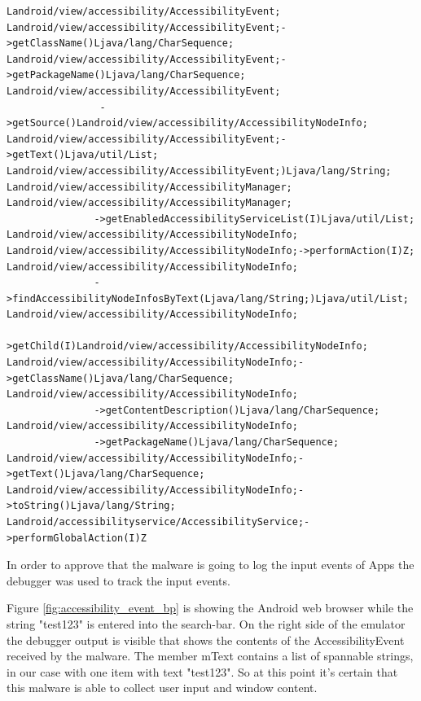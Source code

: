 \documentclass[10pt,titlepage]{article}
\begin{document}
\begin{lstlisting}[label=listofaccessibilitycalls,caption=List of calls to the Accessibility framework of Android. The malware is searching for UI widgets as well as performs global actions (can dismiss Activities like Settings) and gather text entered into UI widgets.,frame=tb]
Landroid/view/accessibility/AccessibilityEvent;
Landroid/view/accessibility/AccessibilityEvent;->getClassName()Ljava/lang/CharSequence;
Landroid/view/accessibility/AccessibilityEvent;->getPackageName()Ljava/lang/CharSequence;
Landroid/view/accessibility/AccessibilityEvent;
                ->getSource()Landroid/view/accessibility/AccessibilityNodeInfo;
Landroid/view/accessibility/AccessibilityEvent;->getText()Ljava/util/List;
Landroid/view/accessibility/AccessibilityEvent;)Ljava/lang/String;
Landroid/view/accessibility/AccessibilityManager;
Landroid/view/accessibility/AccessibilityManager;
               ->getEnabledAccessibilityServiceList(I)Ljava/util/List;
Landroid/view/accessibility/AccessibilityNodeInfo;
Landroid/view/accessibility/AccessibilityNodeInfo;->performAction(I)Z;
Landroid/view/accessibility/AccessibilityNodeInfo;
               ->findAccessibilityNodeInfosByText(Ljava/lang/String;)Ljava/util/List;
Landroid/view/accessibility/AccessibilityNodeInfo;
                >getChild(I)Landroid/view/accessibility/AccessibilityNodeInfo;
Landroid/view/accessibility/AccessibilityNodeInfo;->getClassName()Ljava/lang/CharSequence;
Landroid/view/accessibility/AccessibilityNodeInfo;
               ->getContentDescription()Ljava/lang/CharSequence;
Landroid/view/accessibility/AccessibilityNodeInfo;
               ->getPackageName()Ljava/lang/CharSequence;
Landroid/view/accessibility/AccessibilityNodeInfo;->getText()Ljava/lang/CharSequence;
Landroid/view/accessibility/AccessibilityNodeInfo;->toString()Ljava/lang/String;
Landroid/accessibilityservice/AccessibilityService;->performGlobalAction(I)Z
\end{lstlisting}

In order to approve that the malware is going to log the input events of Apps the debugger was used to track the input events.

Figure \ref{fig:accessibility_event_bp} is showing the Android web browser while the string "test123" is entered into the search-bar. On the right side of the emulator the debugger output is visible that shows the contents of the AccessibilityEvent received by the malware. The member mText contains a list of spannable strings, in our case with one item with text "test123". So at this point it's certain that this malware is able to collect user input and window content.
\end{document}
